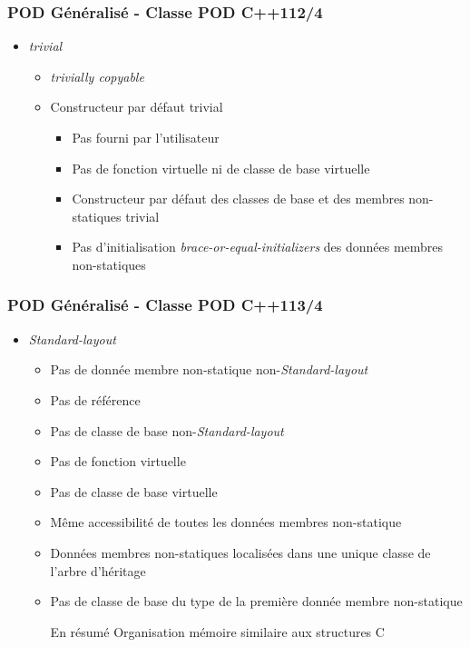 \documentclass[C++.tex]{subfiles}
\begin{document}
\begin{frame}[fragile]
	\frametitle{POD Généralisé - Classe POD C++11\titlehfill{}2/4}
	\begin{itemize}
		\item \textit{trivial}
		\begin{itemize}
			\item \textit{trivially copyable}
			\item Constructeur par défaut trivial
			\begin{itemize}
				\item Pas fourni par l'utilisateur
				\item Pas de fonction virtuelle ni de classe de base virtuelle
				\item Constructeur par défaut des classes de base et des membres non-statiques trivial
				\item Pas d'initialisation \textit{brace-or-equal-initializers} des données membres non-statiques
			\end{itemize}
		\end{itemize}
	\end{itemize}
\end{frame}

\begin{frame}[fragile]
	\frametitle{POD Généralisé - Classe POD C++11\titlehfill{}3/4}
	\begin{itemize}
		\item \textit{Standard-layout}
		\begin{itemize}
			\item Pas de donnée membre non-statique non-\textit{Standard-layout} 
			\item Pas de référence
			\item Pas de classe de base non-\textit{Standard-layout}
			\item Pas de fonction virtuelle 
			\item Pas de classe de base virtuelle
			\item Même accessibilité de toutes les données membres non-statique
			\item Données membres non-statiques localisées dans une unique classe de l'arbre d'héritage


			\item Pas de classe de base du type de la première donnée membre non-statique

			\pause

			\begin{block}{En résumé}
				Organisation mémoire similaire aux structures C
			\end{block}
		\end{itemize}
	\end{itemize}
\end{frame}
\end{document}
